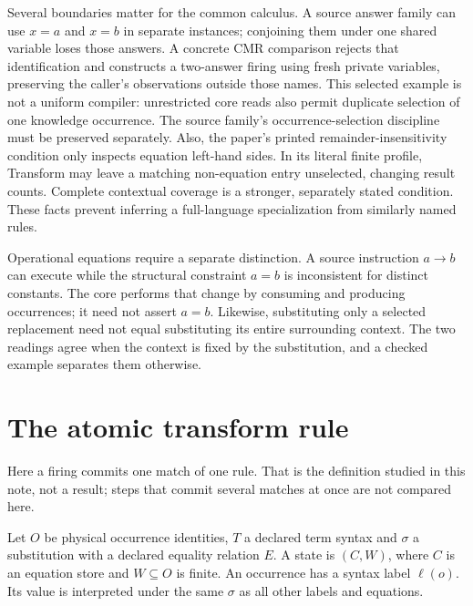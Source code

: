 \documentclass[11pt]{article}
\begin{document}
Several boundaries matter for the common calculus. A source answer
family can use $x=a$ and $x=b$ in separate instances; conjoining them under
one shared variable loses those answers. A concrete CMR comparison rejects
that identification and constructs a two-answer firing using fresh private
variables, preserving the caller's observations outside those names.
This selected example is not a uniform compiler: unrestricted core reads
also permit duplicate selection of one knowledge occurrence. The source
family's occurrence-selection discipline must be preserved separately.
Also, the paper's printed remainder-insensitivity condition only inspects
equation left-hand sides. In its literal finite profile, Transform may leave
a matching non-equation entry unselected, changing result counts. Complete
contextual coverage is a stronger, separately stated condition. These facts
prevent inferring a full-language specialization from similarly named rules.

Operational equations require a separate distinction. A source instruction
$a\longrightarrow b$ can execute while the structural constraint $a=b$ is
inconsistent for distinct constants. The core performs that change by
consuming and producing occurrences; it need not assert $a=b$. Likewise,
substituting only a selected replacement need not equal substituting its
entire surrounding context. The two readings agree when the context is
fixed by the substitution, and a checked example separates them otherwise.

\section{The atomic transform rule}

Here a firing commits one match of one rule. That is the definition studied in
this note, not a result; steps that commit several matches at once are not
compared here.

Let $O$ be physical occurrence identities, $T$ a declared term syntax and
$\sigma$ a substitution with a declared equality relation $E$. A state is
$(C,W)$, where $C$ is an equation store and $W\subseteq O$ is finite.
An occurrence has a syntax label $\ell(o)$. Its value is interpreted under
the same $\sigma$ as all other labels and equations.
\end{document}
